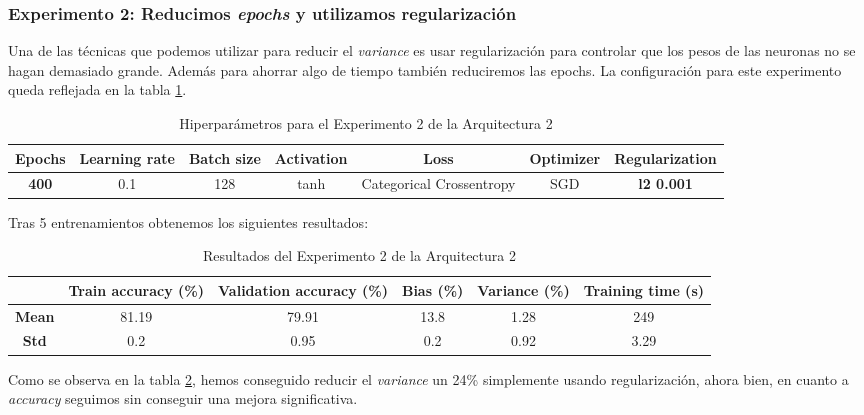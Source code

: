 \documentclass{article}
\begin{document}
			\newpage
			
			
		\subsubsection{Experimento 2: Reducimos \textit{epochs} y utilizamos regularizaci\'on}
		\label{d-s-a2-e2}
			Una de las t\'ecnicas que podemos utilizar para reducir el \textit{variance} es usar regularizaci\'on para controlar que los pesos de las neuronas no se hagan demasiado grande. Adem\'as para ahorrar algo de tiempo tambi\'en reduciremos las epochs. La configuraci\'on para este experimento queda reflejada en la tabla \ref{tab:hip-d-a2-e2}.
			\begin{table}[!h]
				\begin{center}
					\begin{tabular}{| c | c | c | c | c | c | c |}
						\textbf{Epochs} & \textbf{Learning rate} & \textbf{Batch size} & \textbf{Activation} & \textbf{Loss} & \textbf{Optimizer} & \textbf{Regularization} \\ \hline
						\textbf{400} & 0.1 & 128 & tanh & Categorical Crossentropy & SGD & \textbf{l2 0.001}
					\end{tabular}
					\caption{Hiperpar\'ametros para el Experimento 2 de la Arquitectura 2}
					\label{tab:hip-d-a2-e2}
				\end{center}
			\end{table}
			
			Tras 5 entrenamientos obtenemos los siguientes resultados:
			
			\begin{table}[!h]
				\begin{center}
					\begin{tabular}{ c | c | c | c | c | c |}
						\ & \textbf{Train accuracy (\%)} & \textbf{Validation accuracy (\%)} & \textbf{Bias (\%)} & \textbf{Variance (\%)} & \textbf{Training time (s)} \\ \hline
						\textbf{Mean} & 81.19 & 79.91 & 13.8 & 1.28 & 249\\ \hline
						\textbf{Std} & 0.2 & 0.95 & 0.2 & 0.92 & 3.29 \\ \hline
					\end{tabular}
					\caption{Resultados del Experimento 2 de la Arquitectura 2}
					\label{tab:res-d-a2-e2}
				\end{center}
			\end{table}
			
			Como se observa en la tabla \ref{tab:res-d-a2-e2}, hemos conseguido reducir el \textit{variance} un 24\% simplemente usando regularizaci\'on, ahora bien, en cuanto a \textit{accuracy} seguimos sin conseguir una mejora significativa.
			
\end{document}
